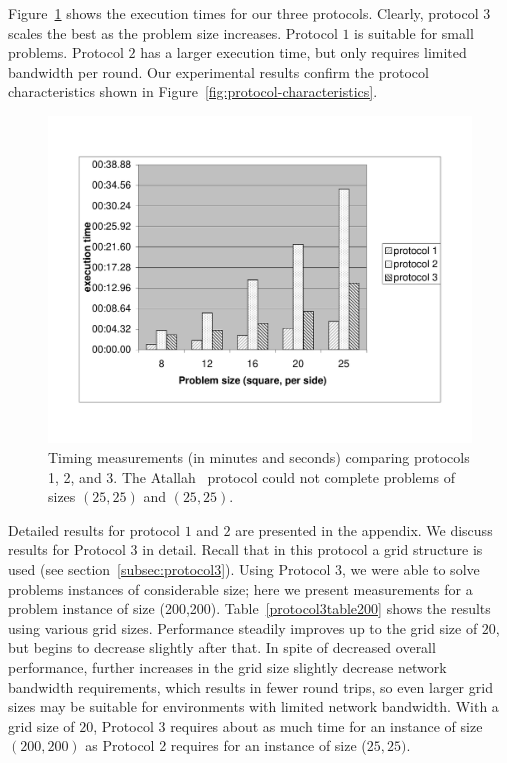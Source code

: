 Figure~\ref{fig:histogram} shows the execution times for our three
protocols. Clearly, protocol $3$ scales the best as the problem size
increases. Protocol $1$ is suitable for small problems. Protocol $2$
has a larger execution time, but only requires limited bandwidth per
round. Our experimental results confirm the protocol characteristics
shown in Figure~\ref{fig:protocol-characteristics}.

\begin{figure}
\centerline{\includegraphics[bb=22bp -50bp 600bp 1000bp,scale=0.4,angle=0]{genomics/proto123}}
\caption{Timing measurements (in minutes and seconds) comparing protocols
1, 2, and 3. The Atallah~\cite{atallah} protocol could not complete problems of
sizes $(25,25)$ and $(25,25)$.}
\label{fig:histogram} 
\end{figure}

Detailed results for protocol $1$ and $2$ are presented in the
appendix.  We discuss results for Protocol $3$ in detail. Recall that
in this protocol a grid structure is used (see
section~\ref{subsec:protocol3}).  Using Protocol $3$, we were able to
solve problems instances of considerable size; here we present
measurements for a problem instance of size
(200,200). Table~\ref{protocol3table200} shows the results using
various grid sizes. Performance steadily improves up to the grid size
of $20$, but begins to decrease slightly after that.  In spite of
decreased overall performance, further increases in the grid size
slightly decrease network bandwidth requirements, which results in
fewer round trips, so even larger grid sizes may be suitable for
environments with limited network bandwidth.  With a grid size of
$20$, Protocol 3 requires about as much time for an instance of size
$(200,200)$ as Protocol 2 requires for an instance of size ($25,25)$.


